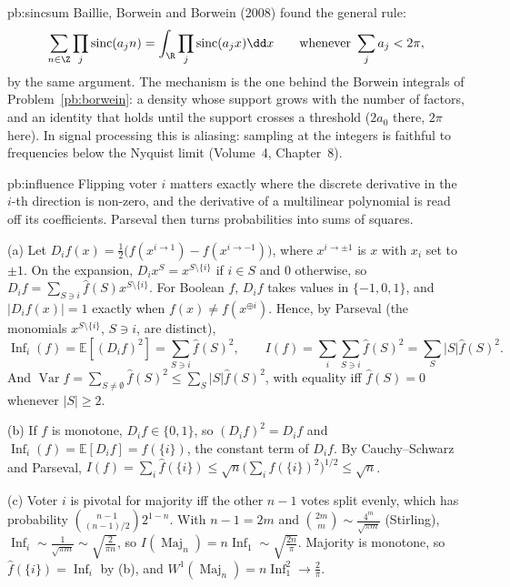 \begin{solution}{pb:sincsum}
\leads Baillie, Borwein and Borwein (2008) found the general rule:
\[
\sum_{n\in\Z}\prod_j\operatorname{sinc}(a_jn)=\int_{\R}\prod_j\operatorname{sinc}(a_jx)\dd x\qquad\text{whenever }\sum_ja_j<2\pi,
\]
by the same argument. The mechanism is the one behind the Borwein integrals of Problem~\ref{pb:borwein}: a density whose support grows with
the number of factors, and an identity that holds until the support crosses a threshold ($2a_0$ there, $2\pi$ here). In signal processing this is aliasing: sampling at the integers is faithful to frequencies below the
Nyquist limit (Volume~4, Chapter~8).
\end{solution}

\begin{solution}{pb:influence}
\idea Flipping voter $i$ matters exactly where the discrete derivative in the $i$-th direction is non-zero, and the derivative of a
multilinear polynomial is read off its coefficients. Parseval then turns probabilities into sums of squares.

\writeup (a) Let $D_if(x)=\frac12\bigl(f(x^{i\to1})-f(x^{i\to-1})\bigr)$, where $x^{i\to\pm1}$ is $x$ with $x_i$ set to $\pm1$. On the expansion, $D_ix^S=x^{S\setminus\{i\}}$ if
$i\in S$ and $0$ otherwise, so $D_if=\sum_{S\ni i}\hat f(S)x^{S\setminus\{i\}}$. For Boolean $f$, $D_if$ takes values in $\{-1,0,1\}$, and $|D_if(x)|=1$ exactly when
$f(x)\ne f(x^{\oplus i})$. Hence, by Parseval (the monomials $x^{S\setminus\{i\}}$, $S\ni i$, are distinct),
\[
\operatorname{Inf}_i(f)=\mathbb E[(D_if)^2]=\sum_{S\ni i}\hat f(S)^2,\qquad I(f)=\sum_i\sum_{S\ni i}\hat f(S)^2=\sum_S|S|\hat f(S)^2.
\]
And $\operatorname{Var}f=\sum_{S\ne\emptyset}\hat f(S)^2\le\sum_S|S|\hat f(S)^2$, with equality iff $\hat f(S)=0$ whenever $|S|\ge2$.

(b) If $f$ is monotone, $D_if\in\{0,1\}$, so $(D_if)^2=D_if$ and $\operatorname{Inf}_i(f)=\mathbb E[D_if]=\hat f(\{i\})$, the constant term of $D_if$. By Cauchy--Schwarz and
Parseval, $I(f)=\sum_i\hat f(\{i\})\le\sqrt n\bigl(\sum_i\hat f(\{i\})^2\bigr)^{1/2}\le\sqrt n$.

(c) Voter $i$ is pivotal for majority iff the other $n-1$ votes split evenly, which has probability $\binom{n-1}{(n-1)/2}2^{1-n}$. With $n-1=2m$ and
$\binom{2m}m\sim\frac{4^m}{\sqrt{\pi m}}$ (Stirling), $\operatorname{Inf}_i\sim\frac1{\sqrt{\pi m}}\sim\sqrt{\frac2{\pi n}}$, so $I(\operatorname{Maj}_n)=n\operatorname{Inf}_1\sim\sqrt{\frac{2n}\pi}$. Majority is monotone, so
$\hat f(\{i\})=\operatorname{Inf}_i$ by (b), and $W^1(\operatorname{Maj}_n)=n\operatorname{Inf}_1^2\to\frac2\pi$.


\end{solution}
